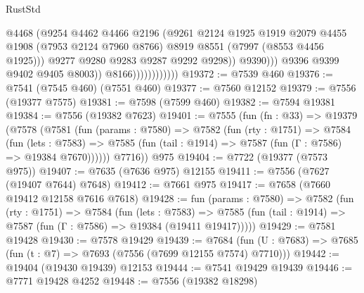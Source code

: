 \begin{lexlean}{RustStd}
\begin{coremodule}
{\begin{coremodule}
{{{{{{{{{{{{{{{{{{{{{{{{{{{{{{{{{{{{{{{{{{{                                        @4468
                                        (@9254
                                          @4462
                                          @4466
                                          @2196
                                          (@9261
                                            @2124
                                            @1925
                                            @1919
                                            @2079
                                            @4455
                                            @1908
                                            (@7953 @2124 @7960 @8766)
                                            @8919
                                            @8551
                                            (@7997 (@8553 @4456 @1925)))
                                          @9277
                                          @9280
                                          @9283
                                          @9287
                                          @9292
                                          @9298))
                                      @9390)))
                                @9396
                                @9399
                                @9402
                                @9405
                                @8003))
                            @8166))))))))))))
@19372 := @7539 @460
@19376 := @7541 (@7545 @460) (@7551 @460)
@19377 := @7560 @12152
@19379 := @7556 (@19377 @7575)
@19381 := @7598 (@7599 @460)
@19382 := @7594 @19381
@19384 := @7556 (@19382 @7623)
@19401 := @7555
    (fun (fn : @33) =>
    @19379
      (@7578
        (@7581
          (fun (params : @7580) =>
          @7582
            (fun (rty : @1751) =>
            @7584
              (fun (lets : @7583) =>
              @7585 (fun (tail : @1914) => @7587 (fun (Γ : @7586) => @19384 @7670))))))
        @7716))
    @975
@19404 := @7722 (@19377 (@7573 @975))
@19407 := @7635 (@7636 @975) @12155
@19411 := @7556 (@7627 (@19407 @7644) @7648)
@19412 := @7661 @975
@19417 := @7658 (@7660 @19412 @12158 @7616 @7618)
@19428 := fun (params : @7580) =>
  @7582
    (fun (rty : @1751) =>
    @7584
      (fun (lets : @7583) =>
      @7585 (fun (tail : @1914) => @7587 (fun (Γ : @7586) => @19384 (@19411 @19417)))))
@19429 := @7581 @19428
@19430 := @7578 @19429
@19439 := @7684
    (fun (U : @7683) => @7685 (fun (t : @7) => @7693 (@7556 (@7699 @12155 @7574) @7710)))
@19442 := @19404 (@19430 @19439) @12153
@19444 := @7541 @19429 @19439
@19446 := @7771 @19428 @4252
@19448 := @7556 (@19382 @18298)
}}}}}}}}}}}}}}}}}}}}}}}}}}}}}}}}}}}}}}}}}}}
\end{coremodule}}
\end{coremodule}
\end{lexlean}
